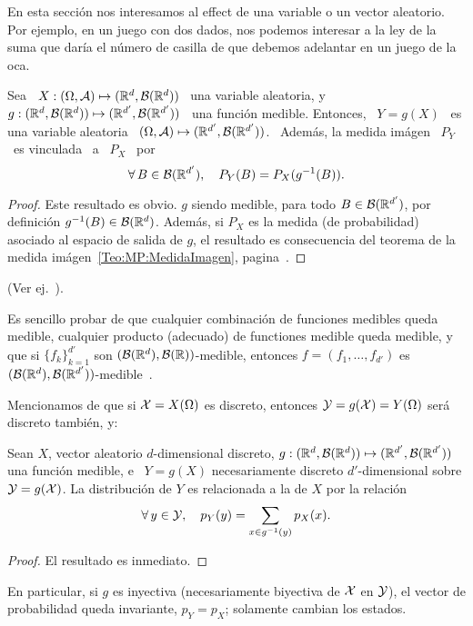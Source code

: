 En  esta  secci\'on nos  interesamos  al  effect de  una  variable  o un  vector
aleatorio. Por  ejemplo, en un juego con  dos dados, nos podemos  interesar a la
ley de la suma que dar\'ia el n\'umero de casilla de que debemos adelantar en un
juego de la oca.
%
\begin{teorema}
\label{Teo:MP:TransformacionMedible}
%
  Sea  \  $X:  (\Omega,\mathcal{A})  \mapsto  (\mathbb{R}^d ,  \mathcal{B}(\mathbb{R}^d))$  \  una  variable
  aleatoria,   y  \   $g:  (\mathbb{R}^d   ,  \mathcal{B}(\mathbb{R}^d))   \mapsto   (\mathbb{R}^{d'}  ,
  \mathcal{B}(\mathbb{R}^{d'}))$ \  una funci\'on  medible. Entonces,  \ $Y =  g(X)$ \  es una
  variable aleatoria  \ $(\Omega,\mathcal{A})  \mapsto (\mathbb{R}^{d'} ,  \mathcal{B}(\mathbb{R}^{d'}))$. \
  Adem\'as, la medida im\'agen \ $P_Y$ \ es vinculada \ a \ $P_X$ \ por
  \[
  \forall \, B \in \mathcal{B}(\mathbb{R}^{d'}), \quad P_Y(B) = P_X(g^{-1}(B)).
  \]
\end{teorema}
%
\begin{proof}
  Este resultado es obvio. $g$ siendo medible, para todo $B \in \mathcal{B}(\mathbb{R}^{d'})$,
  por definici\'on $g^{-1}(B) \in \mathcal{B}(\mathbb{R}^d)$.  Adem\'as, si $P_X$ es la medida
  (de  probabilidad) asociado  al  espacio de  salida  de $g$,  el resultado  es
  consecuencia  del  teorema  de la  medida  im\'agen~\ref{Teo:MP:MedidaImagen},
  pagina~\pageref{Teo:MP:MedidaImagen}.
\end{proof}
%
\noindent (Ver ej.~\cite{Muk00, JacPro03, AthLah06, Bog07:v2, Coh13}).


Es sencillo  probar de que  cualquier combinaci\'on de funciones  medibles queda
medible, cualquier  producto (adecuado) de  functiones medible queda  medible, y
que si $\{ f_k \}_{k=1}^{d'}$ son $(\mathcal{B}(\mathbb{R}^d),\mathcal{B}(\mathbb{R}))$-medible, entonces $f
=          (f_1         ,          \ldots         ,          f_{d'})$         es
$(\mathcal{B}(\mathbb{R}^d),\mathcal{B}(\mathbb{R}^{d'}))$-medible~\cite{AthLah06}.



Mencionamos  de que si  $\mathcal{X} =  X(\Omega)$ es  discreto, entonces  $\mathcal{Y} =  g(\mathcal{X}) =
Y(\Omega)$ ser\'a discreto tambi\'en, y:
%
\begin{teorema}
\label{Teo:MP:TransformacionMasa}
%
  Sean   $X$,   vector  aleatorio   $d$-dimensional   discreto,  $g:(\mathbb{R}^d   ,
  \mathcal{B}(\mathbb{R}^d)) \mapsto (\mathbb{R}^{d'} , \mathcal{B}(\mathbb{R}^{d'}))$ una funci\'on medible, e \
  $Y =  g(X)$ necesariamente discreto  $d'$-dimensional sobre $\mathcal{Y} =  g(\mathcal{X})$.  La
  distribuci\'on de $Y$ es relacionada a la de $X$ por la relaci\'on
  \[
  \forall \, y \in \mathcal{Y}, \quad p_Y(y) = \sum_{x \in g^{-1}(y)} p_X(x).
  \]
\end{teorema}
%
\begin{proof}
  El resultado es inmediato.
\end{proof}
%
\noindent En particular,  si $g$ es inyectiva (necesariamente  biyectiva de $\mathcal{X}$
en $\mathcal{Y}$),  el vector  de probabilidad queda  invariante, $p_Y =  p_X$; solamente
cambian los estados.

